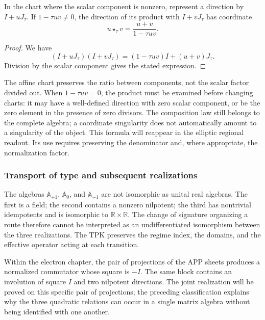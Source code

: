 \begin{proposition}
\label{trit-ampl-prop-pendientes}
In the chart where the scalar component is nonzero, represent a
direction by \(I+uJ_\tau\). If \(1-\tau uv\ne0\), the direction of its
product with \(I+vJ_\tau\) has coordinate
\[
 u\star_\tau v=\frac{u+v}{1-\tau uv}.
\]
\end{proposition}
\begin{proof}
We have
\[
 (I+uJ_\tau)(I+vJ_\tau)
   =(1-\tau uv)I+(u+v)J_\tau.
\]
Division by the scalar component gives the stated expression.
\end{proof}

The affine chart preserves the ratio between components, not the scalar factor
divided out. When \(1-\tau uv=0\), the product must be examined before
changing charts: it may have a well-defined direction with zero scalar
component, or be the zero element in the presence of zero divisors. The composition
law still belongs to the complete algebra; a coordinate singularity
does not automatically amount to a singularity of the object.
This formula will reappear in the elliptic regional readout. Its use requires
preserving the denominator and, where appropriate, the normalization factor.

\subsubsection{Transport of type and subsequent realizations}
\label{trit-ampl-puentes}

The algebras \(\mathbb A_{+1}\), \(\mathbb A_0\), and
\(\mathbb A_{-1}\) are not isomorphic as unital real algebras.
The first is a field; the second contains a nonzero nilpotent; the
third has nontrivial idempotents and is isomorphic to
\(\mathbb R\times\mathbb R\). The change of signature organizing a
route therefore cannot be interpreted as an undifferentiated isomorphism between
the three realizations. The TPK preserves the regime index, the domains, and the
effective operator acting at each transition.

Within the electron chapter, the pair of projections of the APP sheets
produces a normalized commutator whose square is \(-I\). The same block
contains an involution of square \(I\) and two nilpotent directions. The
joint realization will be proved on this specific pair of projections;
the preceding classification explains why the three quadratic relations
can occur in a single matrix algebra without being identified with one another.

